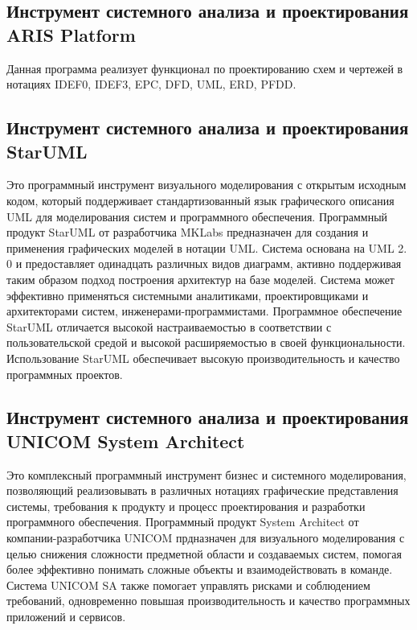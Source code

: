 \subsection{Инструмент системного анализа и проектирования ARIS Platform}\label{sec:ch1/sec6/sub1}
Данная программа реализует функционал по проектированию схем и чертежей в нотациях IDEF0, IDEF3, EPC, DFD, UML, ERD, PFDD.

\subsection{Инструмент системного анализа и проектирования StarUML}\label{sec:ch1/sec6/sub3}
Это программный инструмент визуального моделирования с открытым исходным кодом, который поддерживает стандартизованный язык графического описания UML для моделирования систем и программного обеспечения.
Программный продукт StarUML  от разработчика MKLabs предназначен для создания и применения графических моделей в нотации UML. Система основана на UML 2. 0 и предоставляет одинадцать различных видов диаграмм, активно поддерживая таким образом подход построения архитектур на базе моделей. Система может эффективно применяться системными аналитиками, проектировщиками и архитекторами систем, инженерами-программистами.
Программное обеспечение StarUML отличается высокой настраиваемостью в соответствии с пользовательской средой и высокой расширяемостью в своей функциональности. Использование StarUML обеспечивает высокую производительность и качество программных проектов.
\subsection{Инструмент системного анализа и проектирования UNICOM System Architect}\label{sec:ch1/sec6/sub4}
Это комплексный программный инструмент бизнес и системного моделирования, позволяющий реализовывать в различных нотациях графические представления системы, требования к продукту и процесс проектирования и разработки программного обеспечения.
Программный продукт System Architect от компании-разработчика UNICOM прдназначен для визуального моделирования с целью снижения сложности предметной области и создаваемых систем, помогая более эффективно понимать сложные объекты и взаимодействовать в команде. Система UNICOM SA также помогает управлять рисками и соблюдением требований, одновременно повышая производительность и качество программных приложений и сервисов.
